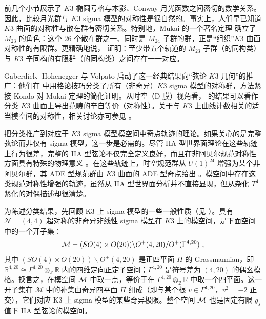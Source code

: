 \documentclass[11pt,a4paper,fontset=windows]{ctexart}
\numberwithin{equation}{section}
\newcommand{\RR}{\mathbb{R}}
\newcommand{\ZZ}{\mathbb{Z}}
\newcommand{\M}{\mathcal{M}}
\newcommand{\be}{\begin{equation}}
\newcommand{\ee}{\end{equation}}
\begin{document}
前几个小节展示了 $K3$ 椭圆亏格与本影、Conway 月光函数之间密切的数学关系。因此，比较月光群与 $K3$ sigma 模型的对称性是很自然的。事实上，人们早已知道 $K3$ 曲面的对称性与散在群有密切关系。特别地，Mukai 的一个著名定理 \cite{Mukai} 确立了 $M_{23}$ 的角色：这个 26 个散在群之一、同时是 $M_{24}$ 子群的群，正是“组织”$K3$ 曲面对称性的有限群。更精确地说，\cite{Mukai} 证明：至少带五个轨道的 $M_{23}$ 子群（的同构类）与 $K3$ 辛同构的有限群（的同构类）之间存在一一对应。


Gaberdiel、Hohenegger 与 Volpato 启动了这一经典结果向“弦论 $K3$ 几何”的推广：他们在 \cite{Gaberdiel2011} 中用格论技巧分类了所有（非奇异）$K3$ sigma 模型的对称群，方法紧接 Kondo \cite{Kondo} 对 Mukai 定理的简化证明。从时空（D-膜）视角看，\cite{Gaberdiel2011} 的结果可以看作分类 $K3$ 曲面上导出范畴的辛自等价（对称性）\cite{MR3586514}。关于与 $K3$ 上曲线计数相关的适当模空间的对称性，相关讨论亦可参见 \cite{Cheng:2015kha}。

\cite{ChengMirandaC.N.2016KSTL} 把分类推广到对应于 $K3$ sigma 模型模空间中奇点轨迹的理论。如果关心的是完整弦论而非仅有 sigma 模型，这一步是必需的。尽管 IIA 型世界面理论在这些轨迹上行为很差，完整的 IIA 型弦论不仅完全定义良好，而且在非阿贝尔规范对称性方面具有特殊的物理意义 \cite{Aspinwall:1995zi}。在这些轨迹上，时空规范群从 $U(1)^{24}$ 增强为某个非阿贝尔群，其 ADE 型规范群由 $K3$ 曲面的 ADE 型奇点给出 \cite{Witten:1995ex,Aspinwall:1995zi}。模空间中存在这类规范对称性增强的轨迹，虽然从 IIA 型世界面分析并不直接显现，但从杂化 $T^4$ 紧化的对偶描述却很清楚。


为陈述分类结果，先回顾 K3 上 sigma 模型的一些一般性质（见 \cite{Aspinwall:1996mn,Nahm:1999ps}）。具有 $\mathcal{N}=(4,4)$ 超对称的非奇异非线性 sigma 模型在 $K3$ 上的模空间，是下面空间中的一个开子集：
\be \label{moduli_space}{\cal M}=(SO(4)\times O(20))\backslash O^+(4,20)/O^+(\Gamma^{4,20})\ ,
\ee
其中 $(SO(4)\times O(20))\backslash O^+(4,20)$ 是正四平面 $\Pi$ 的 Grassmannian，即 $\RR^{4,20}\cong \Gamma^{4,20}\otimes_\ZZ \RR$ 内的四维定向正定子空间；$\Gamma^{4,20}$ 是符号差为 $(4,20)$ 的偶幺模格。换言之，在模空间 ${\cal M}$ 中取一点，等价于在 $\Gamma^{4,20}\otimes_\ZZ \RR$ 中取一个四平面。这一开子集在 $\M$ 中的补集由奇异四平面 $\Pi$ 组成（即与某个根 $v\in \Gamma^{4,20}$，$v^2=-2$ 正交），它们对应 K3 上 sigma 模型的某些奇异极限。整个空间 ${\cal M}$ 也是固定有限 $g_s$ 值下 IIA 型弦论的模空间。
\end{document}
